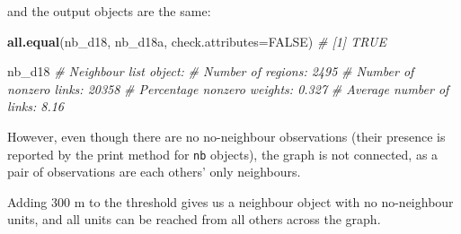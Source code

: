 \documentclass[]{book}
\newenvironment{Shaded}{\begin{snugshade}}{\end{snugshade}}
\newcommand{\CommentTok}[1]{\textcolor[rgb]{0.56,0.35,0.01}{\textit{#1}}}
\newcommand{\DataTypeTok}[1]{\textcolor[rgb]{0.13,0.29,0.53}{#1}}
\newcommand{\DecValTok}[1]{\textcolor[rgb]{0.00,0.00,0.81}{#1}}
\newcommand{\KeywordTok}[1]{\textcolor[rgb]{0.13,0.29,0.53}{\textbf{#1}}}
\newcommand{\NormalTok}[1]{#1}
\newcommand{\OperatorTok}[1]{\textcolor[rgb]{0.81,0.36,0.00}{\textbf{#1}}}
\newcommand{\OtherTok}[1]{\textcolor[rgb]{0.56,0.35,0.01}{#1}}
\newcommand{\StringTok}[1]{\textcolor[rgb]{0.31,0.60,0.02}{#1}}
\begin{document}
and the output objects are the same:

\begin{Shaded}
\begin{Highlighting}[]
\KeywordTok{all.equal}\NormalTok{(nb_d18, nb_d18a, }\DataTypeTok{check.attributes=}\OtherTok{FALSE}\NormalTok{)}
\CommentTok{# [1] TRUE}
\end{Highlighting}
\end{Shaded}

\begin{Shaded}
\begin{Highlighting}[]
\NormalTok{nb_d18}
\CommentTok{# Neighbour list object:}
\CommentTok{# Number of regions: 2495 }
\CommentTok{# Number of nonzero links: 20358 }
\CommentTok{# Percentage nonzero weights: 0.327 }
\CommentTok{# Average number of links: 8.16}
\end{Highlighting}
\end{Shaded}

However, even though there are no no-neighbour observations (their presence is reported by the print method for \texttt{nb} objects), the graph is not connected, as a pair of observations are each others' only neighbours.

\begin{Shaded}
\end{Shaded}

\begin{Shaded}
\end{Shaded}

Adding 300 m to the threshold gives us a neighbour object with no no-neighbour units, and all units can be reached from all others across the graph.

\begin{Shaded}
\end{Shaded}
\end{document}
